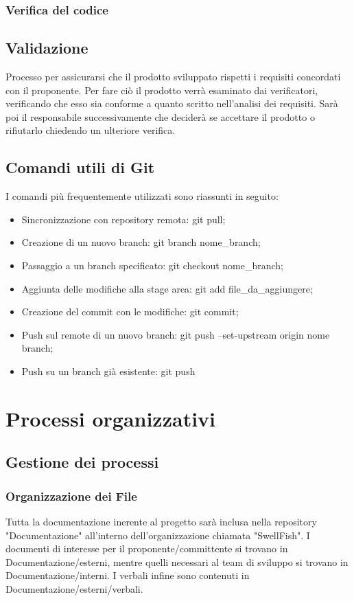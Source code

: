 \documentclass[12pt]{article}
\begin{document}
\subsubsection{Verifica del codice}

\subsection{Validazione}
Processo per assicurarsi che il prodotto sviluppato rispetti i requisiti concordati con il proponente.
Per fare ciò il prodotto verrà esaminato dai verificatori, verificando che esso sia conforme a quanto scritto nell'analisi dei requisiti. Sarà poi il responsabile successivamente che deciderà se accettare il prodotto o rifiutarlo chiedendo un ulteriore verifica. 
\subsection{Comandi utili di Git}
I comandi più frequentemente utilizzati sono riassunti in seguito:
\begin{itemize}
    \item Sincronizzazione con repository remota: git pull;
    \item Creazione di un nuovo branch: git branch nome\_branch;
    \item Passaggio a un branch specificato: git checkout nome\_branch;
    \item Aggiunta delle modifiche alla stage area: git add file\_da\_aggiungere;
    \item Creazione del commit con le modifiche: git commit;
    \item Push sul remote di un nuovo branch: git push --set-upstream origin nome branch;
    \item Push su un branch già esistente: git push
\end{itemize}


\section{Processi organizzativi}
\subsection{Gestione dei processi}
\subsubsection{Organizzazione dei File}
Tutta la documentazione inerente al progetto sarà inclusa nella repository "Documentazione" all'interno dell'organizzazione chiamata "SwellFish".
I documenti di interesse per il proponente/committente si trovano in Documentazione/esterni, mentre quelli necessari al team di sviluppo si trovano in Documentazione/interni. 
I verbali infine sono contenuti in Documentazione/esterni/verbali.
\end{document}
